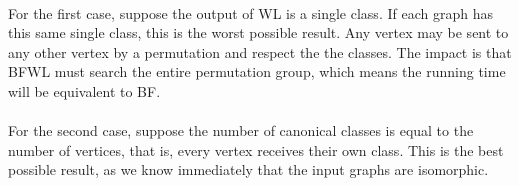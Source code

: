 \paragraph{}For the first case, suppose the output of WL is a single class. If each graph has this same single class, this is the worst possible result. Any vertex may be sent to any other vertex by a permutation and respect the the classes. The impact is that BFWL must search the entire permutation group, which means the running time will be equivalent to BF. 
\paragraph{}For the second case, suppose the number of canonical classes is equal to the number of vertices, that is, every vertex receives their own class. This is the best possible result, as we know immediately that the input graphs are isomorphic. 